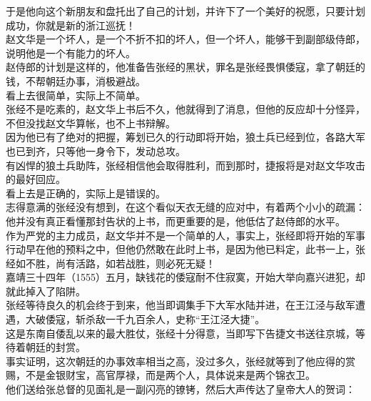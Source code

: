 \begin{multicols}{\theparacolNo}
于是他向这个新朋友和盘托出了自己的计划，并许下了一个美好的祝愿，只要计划成功，你就是新的浙江巡抚！\\

赵文华是一个坏人，是一个不折不扣的坏人，但一个坏人，能够干到副部级侍郎，说明他是一个有能力的坏人。\\

赵侍郎的计划是这样的，他准备告张经的黑状，罪名是张经畏惧倭寇，拿了朝廷的钱，不帮朝廷办事，消极避战。\\

看上去很简单，实际上不简单。\\

张经不是吃素的，赵文华上书后不久，他就得到了消息，但他的反应却十分怪异，不但没找赵文华算帐，也不上书辩解。\\

因为他已有了绝对的把握，筹划已久的行动即将开始，狼土兵已经到位，各路大军也已到齐，只等他一身令下，发动总攻。\\

有凶悍的狼土兵助阵，张经相信他会取得胜利，而到那时，捷报将是对赵文华攻击的最好回应。\\

看上去是正确的，实际上是错误的。\\

志得意满的张经没有想到，在这个看似天衣无缝的应对中，有着两个小小的疏漏：他并没有真正看懂那封告状的上书，而更重要的是，他低估了赵侍郎的水平。\\

作为严党的主力成员，赵文华并不是一个简单的人，事实上，张经即将开始的军事行动早在他的预料之中，但他仍然敢在此时上书，是因为他已料定，此书一上，张经如不胜，尚有活路，如若战胜，则必死无疑！\\

嘉靖三十四年（1555）五月，缺钱花的倭寇耐不住寂寞，开始大举向嘉兴进犯，却就此掉入了陷阱。\\

张经等待良久的机会终于到来，他当即调集手下大军水陆并进，在王江泾与敌军遭遇，大破倭寇，斩杀敌一千九百余人，史称“王江泾大捷”。\\

这是东南自倭乱以来的最大胜仗，张经十分得意，当即写下告捷文书送往京城，等待着朝廷的封赏。\\

事实证明，这次朝廷的办事效率相当之高，没过多久，张经就等到了他应得的赏赐，不是金银财宝，高官厚禄，而是两个人，具体说来是两个锦衣卫。\\

他们送给张总督的见面礼是一副闪亮的镣铐，然后大声传达了皇帝大人的贺词：\\


\end{multicols}
